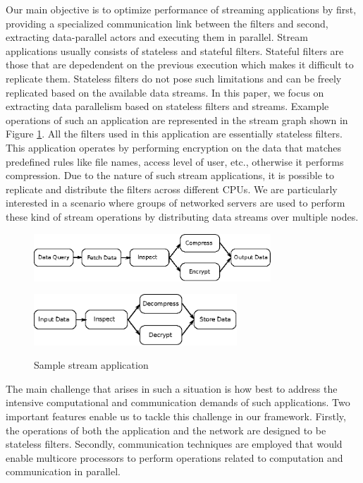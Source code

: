 \documentclass[10pt, conference, compsocconf, reqno]{IEEEtran}
\begin{document}
Our main objective is to optimize performance of streaming applications by first, providing a specialized communication link between the filters and second, extracting data-parallel actors and executing them in parallel. Stream applications usually consists of stateless and stateful filters. Stateful filters are those that are depedendent on the previous execution which makes it difficult to replicate them. Stateless filters do not pose such limitations and can be freely replicated based on the available data streams. In this paper, we focus on extracting data parallelism based on stateless filters and streams. Example operations of such an application are represented in the stream graph shown in Figure \ref{fig1}. All the filters used in this application are essentially stateless filters. This application operates by performing encryption on the data that matches predefined rules like file names, access level of user, etc., otherwise it performs compression. Due to the nature of such stream applications, it is possible to replicate and distribute the filters across different CPUs. We are particularly interested in a scenario where groups of networked servers are used to perform these kind of stream operations by distributing data streams over multiple nodes.

\begin{figure}[ht]
\centering
\subfigure
{
	\includegraphics[width=3.5in]{ip-data-proc}
}

\subfigure
{
	\includegraphics[width=3in]{op-data-proc}
}
\caption{Sample stream application}
\label{fig1}
\end{figure}

The main challenge that arises in such a situation is how best to address the intensive computational and communication demands of such applications. Two important features enable us to tackle this challenge in our framework. Firstly, the operations of both the application and the network are designed to be stateless filters. Secondly, communication techniques are employed that would enable multicore processors to perform operations related to computation and communication in parallel.
\end{document}
